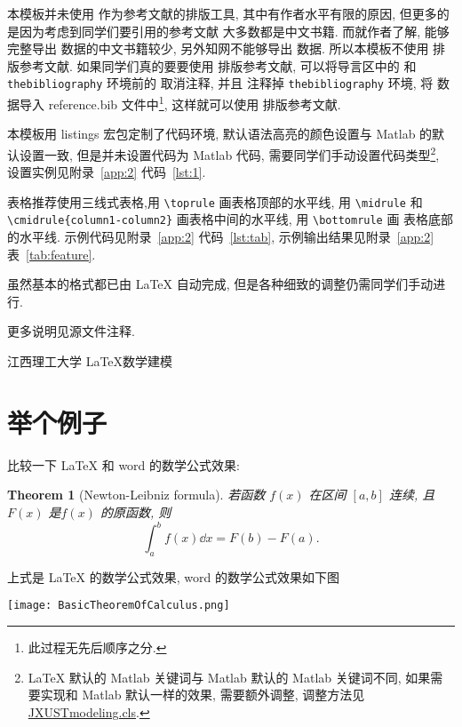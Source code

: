 \documentclass[timesfont,no-math]{JXUSTmodeling}%
\begin{document}
	本模板并未使用  作为参考文献的排版工具, 其中有作者水平有限的原因, 但更多的是因为考虑到同学们要引用的参考文献
	大多数都是中文书籍. 而就作者了解, 能够完整导出  数据的中文书籍较少, 另外知网不能够导出  数据.
	所以本模板不使用  排版参考文献. 如果同学们真的要要使用  排版参考文献, 可以将导言区中的
	\verb|| 和 \verb|thebibliography| 环境前的 \verb|| 取消注释, 并且
	注释掉 \verb|thebibliography| 环境, 将  数据导入 reference.bib 文件中\footnote{此过程无先后顺序之分.},
	这样就可以使用  排版参考文献.
	
	本模板用 listings 宏包\cite{listings-package}定制了代码环境, 默认语法高亮的颜色设置与 Matlab 的默认设置一致,
	但是并未设置代码为 Matlab 代码, 需要同学们手动设置代码类型\footnote{\LaTeX{} 默认的 Matlab 关键词与 Matlab 默认的 Matlab 关键词不同, 如果需要实现和 Matlab 默认一样的效果, 需要额外调整, 调整方法见 \href{JXUSTmodeling.cls}{JXUSTmodeling.cls}.}, 
	设置实例见附录~\ref{app:2} 代码~\ref{lst:1}.
	
	表格推荐使用三线式表格,用 \verb|\toprule| 画表格顶部的水平线,
	用 \verb|\midrule| 和 \lstinline[basicstyle=\ttfamily]|\cmidrule{column1-column2}| 画表格中间的水平线, 用 \verb|\bottomrule| 画
	表格底部的水平线. 示例代码见附录~\ref{app:2} 代码~\ref{lst:tab},
	示例输出结果见附录~\ref{app:2} 表~\ref{tab:feature}.
	
	虽然基本的格式都已由 \LaTeX{} 自动完成, 但是各种细致的调整仍需同学们手动进行. 
	
	更多说明见源文件注释.

	
	\setcounter{page}{1}%
	
	\vphantom{1}
	
	\quad 江西理工大学 \quad \LaTeX{}\quad 数学建模 \quad 
	\newpage
	\section*{举个例子}
	比较一下 \LaTeX{} 和 word 的数学公式效果:
	\newtheorem*{thm}{Theorem}
	
	\begin{thm}[Newton-Leibniz formula]
	若函数 $f(x)$ 在区间 $[a,b]$ 连续, 且 $F(x)$ 是$f(x)$ 的原函数, 则
	\[
		\int_a^b f(x) \dd x= F(b) - F(a) .
	\]
	\end{thm}
	上式是 \LaTeX{} 的数学公式效果, word 的数学公式效果如下图
	\begin{center}
	\texttt{[image: BasicTheoremOfCalculus.png]}
	\end{center}
	
\end{document}
